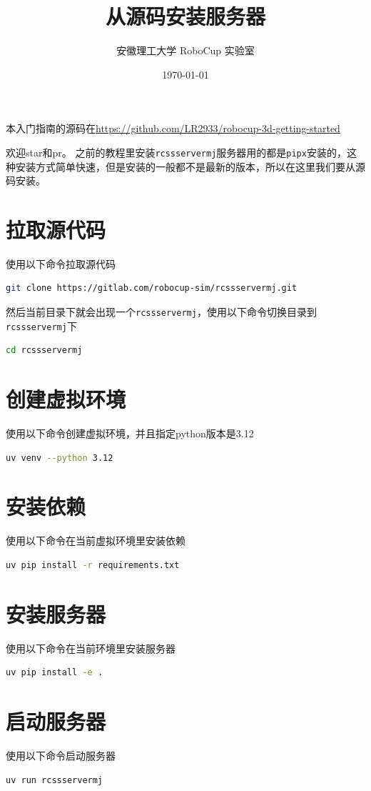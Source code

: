 \documentclass[11pt, UTF8, a4paper]{ctexart} %
\title{\textbf{从源码安装服务器}}
\author{安徽理工大学 RoboCup 实验室}
\date{\today}
\begin{document}
\maketitle

本入门指南的源码在\url{https://github.com/LR2933/robocup-3d-getting-started}

欢迎star和pr。
\tableofcontents %
\newpage
之前的教程里安装\texttt{rcssservermj}服务器用的都是\texttt{pipx}安装的，这种安装方式简单快速，但是安装的一般都不是最新的版本，所以在这里我们要从源码安装。
\section{拉取源代码}
使用以下命令拉取源代码
\begin{lstlisting}[language=bash]
git clone https://gitlab.com/robocup-sim/rcssservermj.git
\end{lstlisting}

然后当前目录下就会出现一个\texttt{rcssservermj}，使用以下命令切换目录到\texttt{rcssservermj}下
\begin{lstlisting}[language=bash]
cd rcssservermj
\end{lstlisting}

\section{创建虚拟环境}
使用以下命令创建虚拟环境，并且指定python版本是3.12
\begin{lstlisting}[language=bash]
uv venv --python 3.12
\end{lstlisting}

\section{安装依赖}
使用以下命令在当前虚拟环境里安装依赖
\begin{lstlisting}[language=bash]
uv pip install -r requirements.txt
\end{lstlisting}

\section{安装服务器}
使用以下命令在当前环境里安装服务器
\begin{lstlisting}[language=bash]
uv pip install -e .
\end{lstlisting}

\section{启动服务器}
使用以下命令启动服务器
\begin{lstlisting}[language=bash]
uv run rcssservermj
\end{lstlisting}
\end{document}
